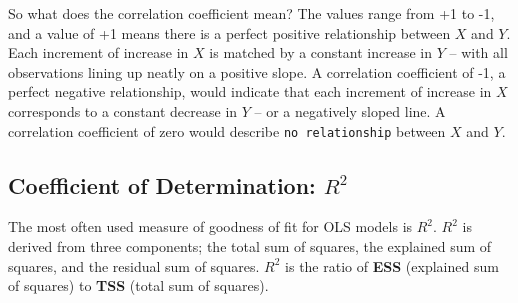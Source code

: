 \documentclass[11pt,openany]{book}\usepackage[]{graphicx}\usepackage[]{color}
\begin{document}
{So what does the correlation coefficient mean? The values range from +1 to -1, and a value of +1 means  there is a perfect positive relationship between $X$ and $Y$. Each increment of increase in $X$ is matched by a constant increase in $Y$ -- with all observations lining up neatly on a positive slope. A correlation  coefficient of -1, a perfect negative relationship, would indicate that each increment of increase in $X$ corresponds to a constant decrease in $Y$ -- or a negatively sloped line. A correlation coefficient of zero would describe \texttt{no relationship} between $X$ and $Y$.

\subsection{Coefficient of Determination: $R^{2}$} 

The most often used measure of goodness of fit for OLS models is $R^{2}$.  $R^{2}$ is derived from three components; the total sum of squares, the explained sum of squares, and the residual sum of squares. $R^{2}$ is the ratio of \textbf{ESS} (explained sum of squares) to \textbf{TSS} (total sum of squares).
 
\begin{grbox}
\end{grbox} 

}
\end{document}
